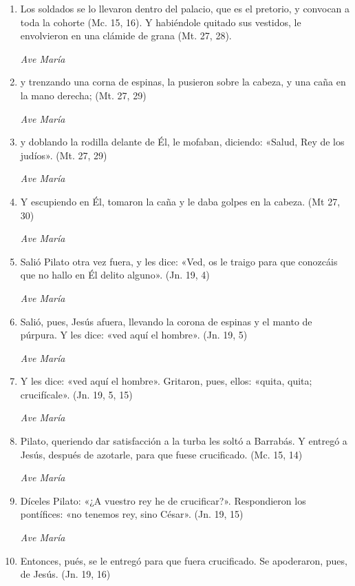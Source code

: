 \documentclass[a4paper,11pt, oneside]{report}
\begin{document}
      \begin{enumerate}

        \item Los soldados se lo llevaron dentro del palacio, que es el pretorio, y convocan a toda la cohorte (Mc. 15, 16).
        Y habiéndole quitado sus vestidos, le envolvieron en una clámide de grana (Mt. 27, 28).

        \textit{Ave María}

        \item y trenzando una corna de espinas, la pusieron sobre la cabeza, y una caña en la mano derecha; (Mt. 27, 29)

        \textit{Ave María}

        \item y doblando la rodilla delante de Él, le mofaban, diciendo: «Salud, Rey de los judíos». (Mt. 27, 29)

        \textit{Ave María}

        \item Y escupiendo en Él, tomaron la caña y le daba golpes en la cabeza. (Mt 27, 30)

        \textit{Ave María}

        \item Salió Pilato otra vez fuera, y les dice: «Ved, os le traigo para que conozcáis que no hallo en Él delito alguno». (Jn. 19, 4)

        \textit{Ave María}

        \item Salió, pues, Jesús afuera, llevando la corona de espinas y el manto de púrpura. Y les dice: «ved aquí el hombre». (Jn. 19, 5)

        \textit{Ave María}

        \item Y les dice: «ved aquí el hombre». Gritaron, pues, ellos: «quita, quita; crucifícale». (Jn. 19, 5, 15)

        \textit{Ave María}

        \item Pilato, queriendo dar satisfacción a la turba les soltó a Barrabás. Y entregó a Jesús, después de azotarle, para que fuese crucificado. (Mc. 15, 14)

        \textit{Ave María}

        \item Díceles Pilato: «¿A vuestro rey he de crucificar?». Respondieron los pontífices: «no tenemos rey, sino César». (Jn. 19, 15)

        \textit{Ave María}

        \item Entonces, pués, se le entregó para que fuera crucificado. Se apoderaron, pues, de Jesús. (Jn. 19, 16)

      \end{enumerate}
\end{document}
